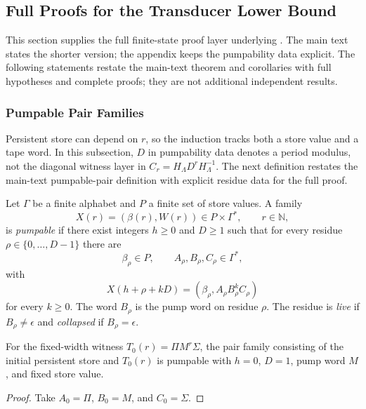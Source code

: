 \subsection{Full Proofs for the Transducer Lower Bound}
\label{app:sec:full-proofs}

This section supplies the full finite-state proof layer underlying
. The main text states
the shorter version; the appendix keeps the pumpability data explicit.
The following statements restate the main-text theorem and corollaries with
full hypotheses and complete proofs; they are not additional independent
results.

\subsubsection{Pumpable Pair Families}

Persistent store can depend on $r$, so the induction tracks both a store value
and a tape word. In this subsection, $D$ in pumpability data denotes a period
modulus, not the diagonal witness layer in $C_r=H_\Lambda D^rH_\Lambda^{-1}$.
The next definition restates the main-text pumpable-pair definition with
explicit residue data for the full proof.

\begin{definition}
\label{app:def:pumpable}
Let $\Gamma$ be a finite alphabet and $P$ a finite set of store values. A family
\[
  X(r)=(\beta(r),W(r))\in P\times\Gamma^*,\qquad r\in\mathbb{N},
\]
is \emph{pumpable} if there exist integers $h\ge0$ and $D\ge1$ such that for
every residue $\rho\in\{0,\ldots,D-1\}$ there are
\[
  \beta_\rho\in P,
  \qquad
  A_\rho,B_\rho,C_\rho\in\Gamma^*,
\]
with
\[
  X(h+\rho+kD)=(\beta_\rho,A_\rho B_\rho^k C_\rho)
\]
for every $k\ge0$. The word $B_\rho$ is the pump word on residue $\rho$. The
residue is \emph{live} if $B_\rho\ne\epsilon$ and \emph{collapsed} if
$B_\rho=\epsilon$.
\end{definition}

\begin{lemma}
\label{app:lem:input-pumpable}
For the fixed-width witness $T_0(r)=\Pi M^r\Sigma$, the pair family consisting
of the initial persistent store and $T_0(r)$ is pumpable with $h=0$, $D=1$,
pump word $M$, and fixed store value.
\end{lemma}

\begin{proof}
Take $A_0=\Pi$, $B_0=M$, and $C_0=\Sigma$.
\end{proof}

